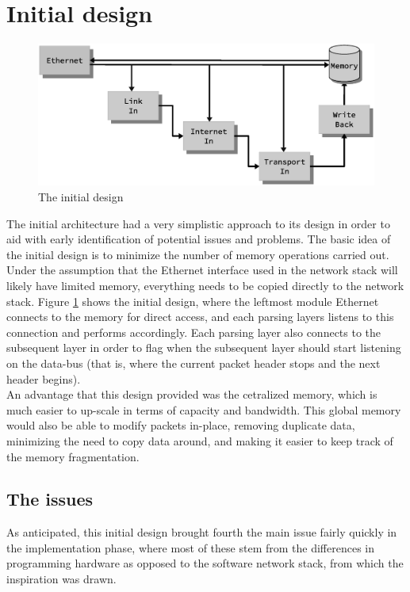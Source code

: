 \section{Initial design}

\begin{figure}
    \centering
    \includegraphics[scale=0.45]{design/design_0.eps}
    \caption{The initial design}
    \label{fig:initial_design}
\end{figure}

The initial architecture had a very simplistic approach to its design in order
to aid with early identification of potential issues and problems.
The basic idea of the initial design is to minimize the number of memory
operations carried out. Under the assumption that the Ethernet interface used in the network
stack will likely have limited memory, everything needs to be copied directly to
the network stack. Figure \ref{fig:initial_design} shows the initial design, where the
leftmost module Ethernet connects to the memory for direct access, and each
parsing layers listens to this connection and performs accordingly. Each parsing
layer also connects to the subsequent layer in order to flag when the subsequent
layer should start listening on the data-bus (that is, where the current packet
header stops and the next header begins).\\
An advantage that this design provided was the cetralized memory, which is much
easier to up-scale in terms of capacity and bandwidth. This global memory would
also be able to modify packets in-place, removing duplicate data, minimizing the
need to copy data around, and making it easier to keep track of the memory
fragmentation.

\subsection{The issues}
As anticipated, this initial design brought fourth the main issue fairly quickly
in the implementation phase, where most of these stem from the differences in
programming hardware as opposed to the software network stack, from which the
inspiration was drawn.

